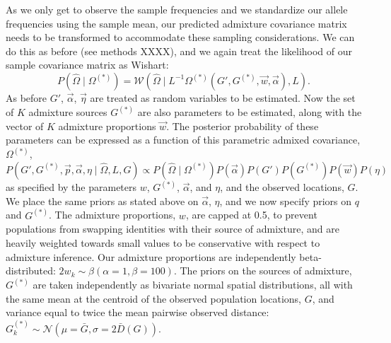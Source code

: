 \documentclass[12pt]{article}
\newcommand{\identifyadmixsource}[1]{{#1^{(*)}}}
\begin{document}
As we only get to observe the sample frequencies and we standardize our allele frequencies using the sample mean, our predicted admixture covariance matrix needs to be transformed to accommodate these sampling considerations. We can do this as before (see methods XXXX), and we again treat the likelihood of our sample covariance matrix as Wishart:
\begin{equation}
\label{eq:wishart_dist_admixed}
P(\widehat{\Omega} \mid \identifyadmixsource{\Omega}) = 
	\mathcal{W}\left(\widehat{\Omega} \mid L^{-1} \identifyadmixsource{\Omega} \left( G',\identifyadmixsource{G}, \vec{w},\vec{\alpha}\right),L \right)	\text{.}
\end{equation}
As before $G'$, $\vec{\alpha}$, $\vec{\eta}$ are treated as random variables to be estimated. Now the set of $K$ admixture sources $\identifyadmixsource{G}$ are also parameters to be estimated, along with the vector of $K$ admixture proportions $\vec{w}$. The posterior probability of these parameters can be expressed as a function of this parametric admixed covariance, $\identifyadmixsource{\Omega}$,
\begin{equation}
\label{eq:admixed_post_prob}
P(G',\identifyadmixsource{G}, \vec{p},\vec{\alpha}, \eta \mid \widehat{\Omega}, L,G) 
	\propto  
		P(\widehat{\Omega}  \mid \identifyadmixsource{\Omega}) P(\vec{\alpha}) P(G') P(\identifyadmixsource{G}) P(\vec{w}) P(\eta) 
\end{equation}
%
as specified by the parameters $w$, $\identifyadmixsource{G}$, $\vec{\alpha}$, and $\eta$, and the observed locations, $G$.  We place the same priors as stated above on $\vec{\alpha}$, $\eta$, and we now specify priors on $q$ and $\identifyadmixsource{G}$.  The admixture proportions, $w$, are capped at 0.5, to prevent populations from swapping identities with their source of admixture, and are heavily weighted towards small values to be conservative with respect to admixture inference.  Our admixture proportions are independently beta-distributed: $2 w_k \sim \beta(\alpha = 1,\beta = 100)$.  The priors on the sources of admixture, $\identifyadmixsource{G}$ are taken independently as bivariate normal spatial distributions, all with the same mean at the centroid of the observed population locations, $G$, and variance equal to twice the mean pairwise observed distance:  $\identifyadmixsource{G_k} \sim \mathcal{N}(\mu = \bar{G},\sigma = 2 \bar{D}(G))$.
\end{document}
